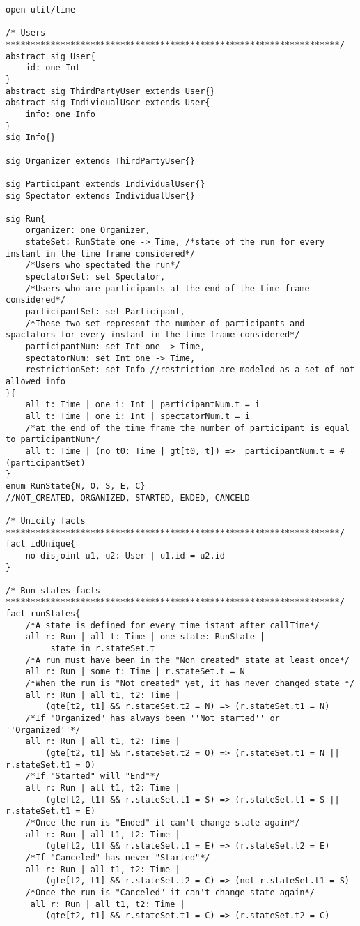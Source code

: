 \begin{lstlisting}
open util/time

/* Users
*******************************************************************/
abstract sig User{
	id: one Int
}
abstract sig ThirdPartyUser extends User{}
abstract sig IndividualUser extends User{
	info: one Info
}
sig Info{}

sig Organizer extends ThirdPartyUser{}

sig Participant extends IndividualUser{}
sig Spectator extends IndividualUser{}

sig Run{
	organizer: one Organizer,
	stateSet: RunState one -> Time, /*state of the run for every instant in the time frame considered*/
	/*Users who spectated the run*/
	spectatorSet: set Spectator,
	/*Users who are participants at the end of the time frame considered*/
	participantSet: set Participant,
	/*These two set represent the number of participants and spactators for every instant in the time frame considered*/
	participantNum: set Int one -> Time,
	spectatorNum: set Int one -> Time,
	restrictionSet: set Info //restriction are modeled as a set of not allowed info
}{
	all t: Time | one i: Int | participantNum.t = i
	all t: Time | one i: Int | spectatorNum.t = i
	/*at the end of the time frame the number of participant is equal to participantNum*/
	all t: Time | (no t0: Time | gt[t0, t]) =>  participantNum.t = #(participantSet)
}
enum RunState{N, O, S, E, C}
//NOT_CREATED, ORGANIZED, STARTED, ENDED, CANCELD

/* Unicity facts
*******************************************************************/
fact idUnique{
	no disjoint u1, u2: User | u1.id = u2.id
}

/* Run states facts
*******************************************************************/
fact runStates{
	/*A state is defined for every time istant after callTime*/
	all r: Run | all t: Time | one state: RunState |
		 state in r.stateSet.t
	/*A run must have been in the "Non created" state at least once*/
	all r: Run | some t: Time | r.stateSet.t = N
	/*When the run is "Not created" yet, it has never changed state	*/
	all r: Run | all t1, t2: Time | 
		(gte[t2, t1] && r.stateSet.t2 = N) => (r.stateSet.t1 = N)
	/*If "Organized" has always been ''Not started'' or ''Organized''*/
	all r: Run | all t1, t2: Time | 
		(gte[t2, t1] && r.stateSet.t2 = O) => (r.stateSet.t1 = N || r.stateSet.t1 = O)
	/*If "Started" will "End"*/
	all r: Run | all t1, t2: Time | 
		(gte[t2, t1] && r.stateSet.t1 = S) => (r.stateSet.t1 = S || r.stateSet.t1 = E)
	/*Once the run is "Ended" it can't change state again*/
	all r: Run | all t1, t2: Time | 
		(gte[t2, t1] && r.stateSet.t1 = E) => (r.stateSet.t2 = E)
	/*If "Canceled" has never "Started"*/
	all r: Run | all t1, t2: Time | 
		(gte[t2, t1] && r.stateSet.t2 = C) => (not r.stateSet.t1 = S)
	/*Once the run is "Canceled" it can't change state again*/
	 all r: Run | all t1, t2: Time | 
		(gte[t2, t1] && r.stateSet.t1 = C) => (r.stateSet.t2 = C)
	

\end{lstlisting}
